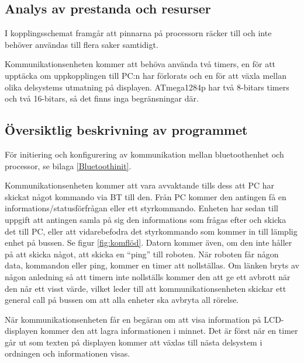 \subsection{Analys av prestanda och resurser}

I kopplingsschemat framgår att pinnarna på processorn räcker till och inte behöver användas till flera saker samtidigt. 

Kommunikationsenheten kommer att behöva använda två timers, en för att upptäcka om uppkopplingen till PC:n har förlorats och en för att växla mellan olika delsystems utmatning på displayen. ATmega1284p har två 8-bitars timers och två 16-bitars, så det finns inga begränsningar där.

\subsection{Översiktlig beskrivning av programmet}

För initiering och konfigurering av kommunikation mellan bluetoothenhet och processor, se bilaga \ref{Bluetoothinit}.

Kommunikationsenheten kommer att vara avvaktande tills dess att PC har skickat något kommando via BT till den. Från PC kommer den antingen få en informations/statusförfrågan eller ett styrkommando. Enheten har sedan till uppgift att antingen samla på sig den informations som frågas efter och skicka det till PC, eller att vidarebefodra det styrkommando som kommer in till lämplig enhet på bussen. Se figur \ref{fig:komflöd}.
Datorn kommer även, om den inte håller på att skicka något, att skicka en “ping” till roboten. När roboten får någon data, kommandon eller ping, kommer en timer att nollställas. Om länken bryts av någon anledning så att timern inte nollställs kommer den att ge ett avbrott när den når ett visst värde, vilket leder till att kommunikationsenheten skickar ett general call på bussen om att alla enheter ska avbryta all rörelse.

När kommunikationsenheten får en begäran om att visa information på LCD-displayen kommer den att lagra informationen i minnet. Det är först när en timer går ut som texten på displayen kommer att växlas till nästa delsystem i ordningen och informationen visas.

